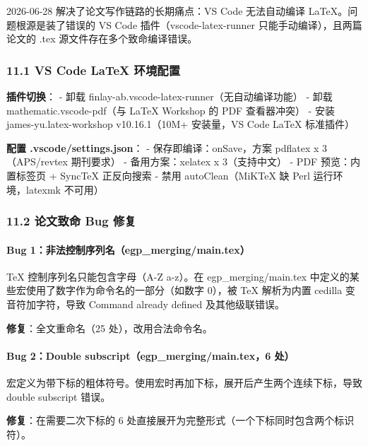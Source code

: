 \documentclass[
  12pt,
]{ctexart}
\begin{document}
2026-06-28 解决了论文写作链路的长期痛点：VS Code 无法自动编译
LaTeX。问题根源是装了错误的 VS Code 插件（vscode-latex-runner
只能手动编译），且两篇论文的 .tex 源文件存在多个致命编译错误。

\subsubsection{11.1 VS Code LaTeX
环境配置}\label{vs-code-latex-ux73afux5883ux914dux7f6e}

\textbf{插件切换}： - 卸载
finlay-ab.vscode-latex-runner（无自动编译功能） - 卸载
mathematic.vscode-pdf（与 LaTeX Workshop 的 PDF 查看器冲突） - 安装
james-yu.latex-workshop v10.16.1（10M+ 安装量，VS Code LaTeX 标准插件）

\textbf{配置 .vscode/settings.json}： - 保存即编译：onSave，方案
pdflatex x 3（APS/revtex 期刊要求） - 备用方案：xelatex x 3（支持中文）
- PDF 预览：内置标签页 + SyncTeX 正反向搜索 - 禁用 autoClean（MiKTeX 缺
Perl 运行环境，latexmk 不可用）

\subsubsection{11.2 论文致命 Bug
修复}\label{ux8bbaux6587ux81f4ux547d-bug-ux4feeux590d}

\paragraph{Bug
1：非法控制序列名（egp\_merging/main.tex）}\label{bug-1ux975eux6cd5ux63a7ux5236ux5e8fux5217ux540degp_mergingmain.tex}

TeX 控制序列名只能包含字母（A-Z a-z）。在 egp\_merging/main.tex
中定义的某些宏使用了数字作为命令名的一部分（如数字 0），被 TeX
解析为内置 cedilla 变音符加字符，导致 Command already defined
及其他级联错误。

\textbf{修复}：全文重命名（25 处），改用合法命令名。

\paragraph{Bug 2：Double subscript（egp\_merging/main.tex，6
处）}\label{bug-2double-subscriptegp_mergingmain.tex6-ux5904}

宏定义为带下标的粗体符号。使用宏时再加下标，展开后产生两个连续下标，导致
double subscript 错误。

\textbf{修复}：在需要二次下标的 6
处直接展开为完整形式（一个下标同时包含两个标识符）。
\end{document}
